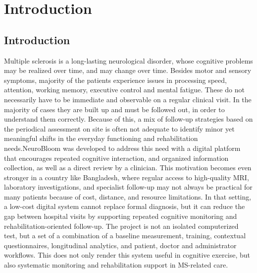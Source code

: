 \documentclass[12pt,a4paper]{report}
\begin{document}
\listoffigures
{}
\clearpage


\chapter{Introduction}

\section{Introduction}
Multiple sclerosis is a long-lasting neurological disorder, whose cognitive problems may be realized over time, and may change over time. Besides motor and sensory symptoms, majority of the patients experience issues in processing speed, attention, working memory, executive control and mental fatigue. These do not necessarily have to be immediate and observable on a regular clinical visit. In the majority of cases they are built up and must be followed out, in order to understand them correctly. Because of this, a mix of follow-up strategies based on the periodical assessment on site is often not adequate to identify minor yet meaningful shifts in the everyday functioning and rehabilitation needs.NeuroBloom was developed to address this need with a digital platform that encourages repeated cognitive interaction, and organized information collection, as well as a direct review by a clinician. This motivation becomes even stronger in a country like Bangladesh, where regular access to high-quality MRI, laboratory investigations, and specialist follow-up may not always be practical for many patients because of cost, distance, and resource limitations. In that setting, a low-cost digital system cannot replace formal diagnosis, but it can reduce the gap between hospital visits by supporting repeated cognitive monitoring and rehabilitation-oriented follow-up. The project is not an isolated computerized test, but a set of a combination of a baseline measurement, training, contextual questionnaires, longitudinal analytics, and patient, doctor and administrator workflows. This does not only render this system useful in cognitive exercise, but also systematic monitoring and rehabilitation support in MS-related care.
\end{document}
